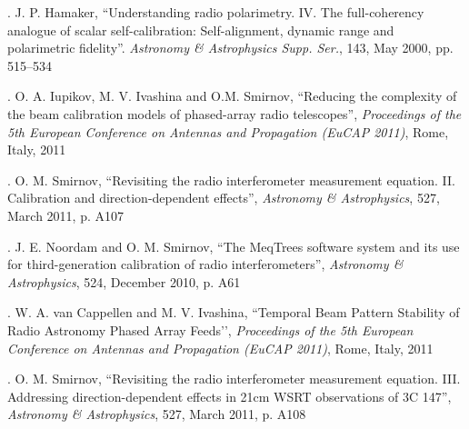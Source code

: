 \documentclass{aps2010} \special{papersize=8.5in,11in}
\begin{document}
. J. P. Hamaker, ``Understanding radio polarimetry. IV. The full-coherency analogue of scalar self-calibration: Self-alignment, dynamic range and polarimetric fidelity''.
\emph{Astronomy \& Astrophysics Supp. Ser.}, 143, May 2000, pp. 515--534

. O. A. Iupikov, M. V. Ivashina and O.M. Smirnov, ``Reducing the complexity of the beam calibration models of phased-array radio telescopes'', \emph{Proceedings of the 5th European Conference on Antennas and Propagation (EuCAP 2011)}, Rome, Italy, 2011

. O. M. Smirnov, ``Revisiting the radio interferometer measurement equation. II. Calibration and direction-dependent effects'',
\emph{Astronomy \& Astrophysics}, 527, March 2011, p. A107

. J. E. Noordam and O. M. Smirnov, ``The MeqTrees software system and its use for third-generation calibration of radio interferometers'',
\emph{Astronomy \& Astrophysics}, 524, December 2010, p. A61

. W. A. van Cappellen and M. V. Ivashina, ``Temporal Beam Pattern Stability of Radio Astronomy Phased Array Feeds’',
\emph{Proceedings of the 5th European Conference on Antennas and Propagation (EuCAP 2011)}, Rome, Italy, 2011

. O. M. Smirnov, ``Revisiting the radio interferometer measurement equation. III. Addressing direction-dependent effects in 21cm WSRT observations of 3C 147'',
\emph{Astronomy \& Astrophysics}, 527, March 2011, p. A108
\end{document}
